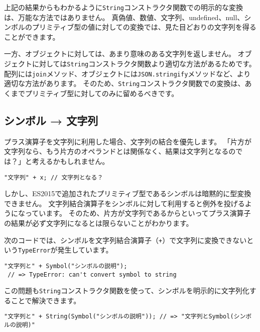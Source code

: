上記の結果からもわかるように\texttt{String}コンストラクタ関数での明示的な変換は、万能な方法ではありません。
真偽値、数値、文字列、undefined、null、シンボルのプリミティブ型の値に対しての変換では、見た目どおりの文字列を得ることができます。

一方、オブジェクトに対しては、あまり意味のある文字列を返しません。
オブジェクトに対しては\texttt{String}コンストラクタ関数より適切な方法があるためです。
配列には\texttt{join}メソッド、オブジェクトには\texttt{JSON.stringify}メソッドなど、より適切な方法があります。
そのため、\texttt{String}コンストラクタ関数での変換は、あくまでプリミティブ型に対してのみに留めるべきです。

\hypertarget{symbol-to-string}{%
\subsection{シンボル → 文字列}\label{symbol-to-string}}

プラス演算子を文字列に利用した場合、文字列の結合を優先します。
「片方が文字列なら、もう片方のオペランドとは関係なく、結果は文字列となるのでは？」と考えるかもしれません。

\begin{lstlisting}
"文字列" + x; // 文字列となる？
\end{lstlisting}

しかし、ES2015で追加されたプリミティブ型であるシンボルは暗黙的に型変換できません。
文字列結合演算子をシンボルに対して利用すると例外を投げるようになっています。
そのため、片方が文字列であるからといってプラス演算子の結果が必ず文字列になるとは限らないことがわかります。

次のコードでは、シンボルを文字列結合演算子（\texttt{+}）で文字列に変換できないという\texttt{TypeError}が発生しています。

\begin{lstlisting}
"文字列と" + Symbol("シンボルの説明");
 // => TypeError: can't convert symbol to string
\end{lstlisting}

この問題も\texttt{String}コンストラクタ関数を使って、シンボルを明示的に文字列化することで解決できます。

\begin{lstlisting}
"文字列と" + String(Symbol("シンボルの説明")); // => "文字列とSymbol(シンボルの説明)"
\end{lstlisting}

